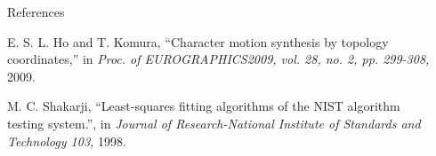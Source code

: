 \documentclass[final,hyperref={pdfpagelabels=false}]{beamer}
\begin{document}
\begin{frame}[t]
\begin{columns}[t]
\begin{column}{0.47\textwidth}
\begin{block}{References}
{\begin{thebibliography}{10}
E. S. L. Ho and T. Komura, ``Character motion synthesis by topology coordinates,'' in \emph{Proc. of EUROGRAPHICS2009, vol. 28, no. 2, pp. 299-308,} 2009.

M. C. Shakarji, ``Least-squares fitting algorithms of the NIST algorithm testing system.'', in \emph{Journal of Research-National Institute of Standards and Technology 103,} 1998.
\end{thebibliography}}

\end{block}

\end{column}

\begin{column}{.02\textwidth}\end{column}

\end{columns}

\end{frame}
\end{document}
